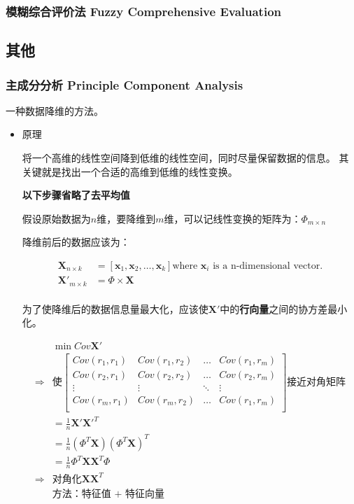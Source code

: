 \documentclass{article}
\begin{document}
\subsubsection{模糊综合评价法 Fuzzy Comprehensive Evaluation}

\subsection{其他}

\subsubsection{主成分分析 Principle Component Analysis}

一种数据降维的方法。

\begin{itemize}

\item{原理}

将一个高维的线性空间降到低维的线性空间，同时尽量保留数据的信息。
其关键就是找出一个合适的高维到低维的线性变换。

\textbf{以下步骤省略了去平均值}

假设原始数据为$n$维，要降维到$m$维，可以记线性变换的矩阵为：$\boldsymbol{\varPhi}_{m\times n}$

降维前后的数据应该为：

\[\begin{split}
    \mathbf{X}_{n \times k} & = [\mathbf{x}_1, \mathbf{x}_2, \ldots, \mathbf{x}_k] \text{where $\mathbf{x}_i$ is a n-dimensional vector.}\\
    \mathbf{X}'_{m \times k} & = \boldsymbol{\varPhi} \times \mathbf{X}\\
\end{split}\]

为了使降维后的数据信息量最大化，应该使$\mathbf{X}'$中的\textbf{行向量}之间的协方差最小化。

\[\begin{split}
    & \min Cov\mathbf{X}' \\
    \Rightarrow & \text{使} \begin{bmatrix}
        Cov(r_1, r_1) & Cov(r_1, r_2) & \ldots & Cov(r_1, r_m)\\
        Cov(r_2, r_1) & Cov(r_2, r_2) & \ldots & Cov(r_2, r_m)\\
        \vdots & \vdots & \ddots & \vdots \\
        Cov(r_m, r_1) & Cov(r_m, r_2) & \ldots & Cov(r_1, r_m)\\
    \end{bmatrix} \text{接近对角矩阵}\\
    & = \frac{1}{n}\mathbf{X}'\mathbf{X}'^T\\
    & = \frac{1}{n}(\boldsymbol{\varPhi}^T \mathbf{X})(\boldsymbol{\varPhi}^T \mathbf{X})^T\\
    & = \frac{1}{n}\boldsymbol{\varPhi}^T \mathbf{X}\mathbf{X}^T \boldsymbol{\varPhi}\\
    \Rightarrow & \text{对角化} \mathbf{XX}^T\\
    & \text{方法：特征值 + 特征向量}
\end{split}\]


\end{itemize}
\end{document}
